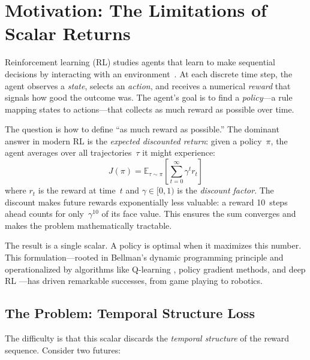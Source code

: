 \documentclass[9pt,a4paper]{article}
\theoremstyle{plain}
\theoremstyle{definition}
\theoremstyle{remark}
\begin{document}
\begin{abstract}
This document is itself the proof: compiling it with \texttt{agda --latex} type-checks all embedded code while producing this PDF.
\end{abstract}


\section{Motivation: The Limitations of Scalar Returns}

Reinforcement learning (RL) studies agents that learn to make sequential decisions by interacting with an environment~\cite{Sutton2018}.  At each discrete time step, the agent observes a \emph{state}, selects an \emph{action}, and receives a numerical \emph{reward} that signals how good the outcome was.  The agent's goal is to find a \emph{policy}---a rule mapping states to actions---that collects as much reward as possible over time.

The question is how to define ``as much reward as possible.''  The dominant answer in modern RL is the \emph{expected discounted return}: given a policy~$\pi$, the agent averages over all trajectories~$\tau$ it might experience:
\[
J(\pi) = \mathbb{E}_{\tau \sim \pi} \left[ \sum_{t=0}^{\infty} \gamma^t r_t \right]
\]
where $r_t$ is the reward at time~$t$ and $\gamma \in [0,1)$ is the \emph{discount factor}.  The discount makes future rewards exponentially less valuable: a reward 10~steps ahead counts for only~$\gamma^{10}$ of its face value.  This ensures the sum converges and makes the problem mathematically tractable.

The result is a single scalar.  A policy is optimal when it maximizes this number.  This formulation---rooted in Bellman's dynamic programming principle \cite{Bellman1957} and operationalized by algorithms like Q-learning \cite{Watkins1992}, policy gradient methods, and deep RL \cite{Mnih2015}---has driven remarkable successes, from game playing to robotics.

\subsection{The Problem: Temporal Structure Loss}

The difficulty is that this scalar discards the \emph{temporal structure} of the reward sequence.  Consider two futures:
\end{document}
